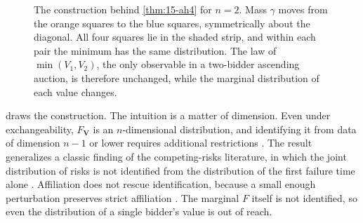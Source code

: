 \begin{figure}[htbp]
\centering
{}
\caption{The construction behind \cref{thm:15-ah4} for $n=2$. Mass $\gamma$ moves from the orange squares to the blue
squares, symmetrically about the diagonal. All four squares lie in the shaded strip, and within each pair the minimum
has the same distribution. The law of $\min(V_1,V_2)$, the only observable in a two-bidder ascending auction, is
therefore unchanged, while the marginal distribution of each value changes.}\label{fig:15-perturb}
\end{figure}

 draws the construction. The intuition is a matter of dimension. Even under exchangeability,
$F_{\bm V}$ is an $n$-dimensional distribution, and identifying it from data of dimension $n-1$ or lower requires
additional restrictions \citep[Section~3.3.2]{AtheyHaile2007}. The result generalizes a classic finding of the
competing-risks literature, in which the joint distribution of risks is not identified from the distribution of the
first failure time alone \citep[footnote~26]{AtheyHaile2002}. Affiliation does not rescue identification, because a
small enough perturbation preserves strict affiliation \citep[footnote~27]{AtheyHaile2002}. The marginal $F$ itself
is not identified, so even the distribution of a single bidder's value is out of reach.

